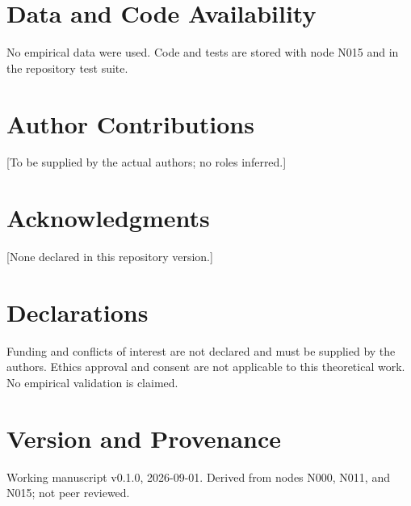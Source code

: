 \documentclass[11pt]{article}
\begin{document}
\section*{Data and Code Availability}
No empirical data were used. Code and tests are stored with node N015 and in the
repository test suite.

\section*{Author Contributions}
[To be supplied by the actual authors; no roles inferred.]

\section*{Acknowledgments}
[None declared in this repository version.]

\section*{Declarations}
Funding and conflicts of interest are not declared and must be supplied by the
authors. Ethics approval and consent are not applicable to this theoretical work.
No empirical validation is claimed.

\section*{Version and Provenance}
Working manuscript v0.1.0, 2026-09-01. Derived from nodes N000, N011, and N015;
not peer reviewed.



\end{document}
